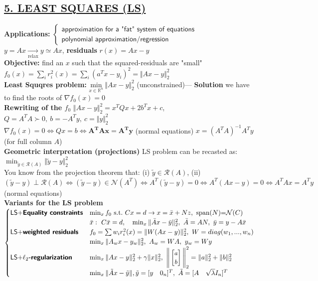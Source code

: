 \documentclass[a4paper]{article}
\begin{document}
\subsection*{\color{cyan} \textsf{\underline{5. LEAST SQUARES (LS)}}}
\textbf{Applications:} $\begin{cases}
    \textsf{approximation for a "fat" system of equations}\\
    \textsf{polynomial approximation/regression}
\end{cases}$ {\large{$y = Ax \underset{\text{relax}}{\longrightarrow} y \simeq Ax$}},  \textbf{residuals} $r(x) = Ax-y$\\
\textbf{Objective:} find an $x$ such that the squared-residuals are "small" 
$f_0(x) = \sum_i {r_i^2(x)} =\sum_i {(a^T x - y_i)^2} = \Vert Ax-y \Vert_2^2$\\
\textbf{Least Squqres problem: }    $\underset{x\in\mathbb{R}^n}{\text{min}} \ {\Vert Ax-y \Vert_2^2}$ (unconstrained)--- 
\textbf{Solution} we have to find the roots of $\nabla{f_0}(x)=0$\\
\textbf{Rewriting of the $f_0$} $\Vert Ax-y \Vert_2^2 = x^T{Q}x+2b^T{x}+c$, $Q=A^T A\succ0, \ b=-A^T y, \ c=\Vert{y}\Vert_2^2$\\
$\nabla{f_0}(x)=0\iff Qx=b\iff \mathbf{A^T A x = A^T y}$ (normal equations) $x=(A^T A)^{-1} A^T y$ (for full column $A$)\\
\textbf{Geometric interpretation (projections)} LS problem can be recasted as: $\min_{\tilde{y}\in\mathcal{R}(A)}{\Vert \tilde{y} - y \Vert_2^2}$\\
You know from the projection theorem that: (i) $\tilde{y}\in\mathcal{R}(A)$, (ii) $(\tilde{y}-y) \perp \mathcal{R}(A) \iff (\tilde{y}-y)\in \mathcal{N}(A^T)\iff A^T{(\tilde{y}-y)}=0 \iff A^T{(Ax-y)}=0  \iff A^T A x = A^T y$ (normal equations)\\
\textbf{Variants for the LS problem} $\begin{cases}
    \textsf{LS+\textbf{Equality constraints}}& \min_x {f_0} \ \text{s.t.} \  Cx=d \to x=\bar{x}+Nz, \  \text{span($N$)=$\mathcal{N}(C)$}\\
     & \bar{x}: \ C\bar{x}=d , \quad \min_x {\Vert \bar{A}x-\bar{y}\Vert_2^2}, \ \bar{A}=AN,  \ \bar{y}=y-A\bar{x}\\
    \textsf{LS+\textbf{weighted residuals}}& f_0=\sum w_i r_i^2(x) = \Vert W(Ax-y) \Vert_2^2, \ W=diag(w_1,...,w_n)\\
     & \min_x \Vert A_w x -y_w \Vert_2^2, \ A_w = WA, \ y_w = Wy\\
    \textsf{LS+\textbf{$\ell_2$-regularization}}&\min_{x} {\Vert Ax-y \Vert_2^2} + \gamma\Vert x \Vert_2^2, \ 
    {\small \Bigg\Vert 
        \begin{bmatrix}
            a\\b
        \end{bmatrix}
     \Bigg\Vert}_2^2 = \Vert a \Vert_2^2 + \Vert b \Vert_2^2\\
      & \min_x {\Vert{\tilde{A}x-\tilde{y}}\Vert}, \tilde{y} = [y\quad{0_n}]^T, \ \tilde{A} = [A\quad \sqrt{\lambda}{I_n}]^T
\end{cases}$
\end{document}
